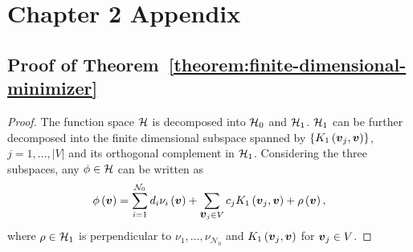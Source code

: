 \chapter{Chapter 2 Appendix} \label{chapter-2-appendix}

\section{Proof of Theorem~\ref{theorem:finite-dimensional-minimizer}}

\begin{proof}%
%
%

The function space $\mathcal{H}$ is decomposed into $\mathcal{H}_0$ and $\mathcal{H}_1$. $\mathcal{H}_1$ can be further decomposed into the finite dimensional subspace spanned by $\left\{K_1\left(\mbox{\boldmath $v$}_{j}, \mbox{\boldmath $v$}\right) \right\}$, $j = 1, \dots, \vert V\vert$ and its orthogonal complement in $\mathcal{H}_1$. Considering the three subspaces, any $\phi \in \mathcal{H}$ can be written as
\begin{equation} \label{eq:form-of-the-minimizer-phi-plus-rho}
\phi\left(\mbox{\boldmath $v$}\right) = \sum_{i = 1}^{\mathcal{N}_0} d_i \nu_i \left(\mbox{\boldmath $v$}\right) + \sum_{\mbox{\boldmath $v$}_{j} \in V} c_j K_1\left(\mbox{\boldmath $v$}_j, \mbox{\boldmath $v$}\right) + \rho\left( \mbox{\boldmath $v$}\right) ,
\end{equation}
\noindent
where $\rho \in \mathcal{H}_1$ is perpendicular to $\nu_1,\dots, \nu_{\mathcal{N}_0}$ and $K_1\left(\mbox{\boldmath $v$}_j, \mbox{\boldmath $v$}\right)$ for $\mbox{\boldmath $v$}_j \in V$. 


\end{proof}
